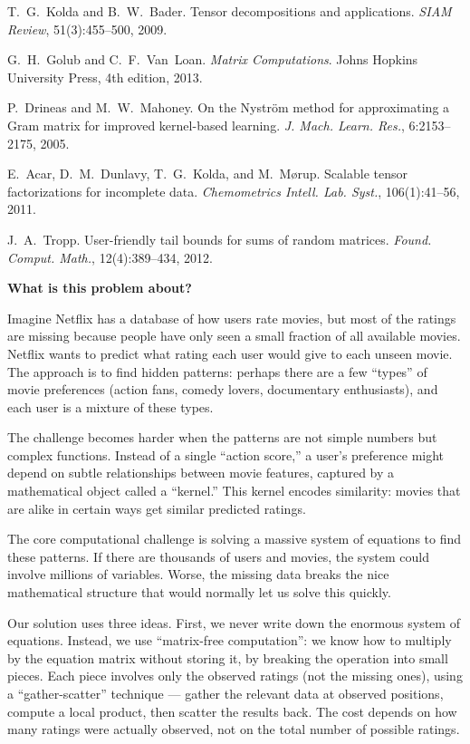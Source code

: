  T.~G.~Kolda and B.~W.~Bader.
Tensor decompositions and applications.
\emph{SIAM Review}, 51(3):455--500, 2009.

 G.~H.~Golub and C.~F.~Van~Loan.
\emph{Matrix Computations}.
Johns Hopkins University Press, 4th edition, 2013.

 P.~Drineas and M.~W.~Mahoney.
On the Nystr\"om method for approximating a Gram matrix for improved kernel-based learning.
\emph{J. Mach. Learn. Res.}, 6:2153--2175, 2005.

 E.~Acar, D.~M.~Dunlavy, T.~G.~Kolda, and M.~M{\o}rup.
Scalable tensor factorizations for incomplete data.
\emph{Chemometrics Intell. Lab. Syst.}, 106(1):41--56, 2011.

 J.~A.~Tropp.
User-friendly tail bounds for sums of random matrices.
\emph{Found. Comput. Math.}, 12(4):389--434, 2012.


\textbf{What is this problem about?}

Imagine Netflix has a database of how users rate movies, but most of the ratings
are missing because people have only seen a small fraction of all available movies.
Netflix wants to predict what rating each user would give to each unseen movie.
The approach is to find hidden patterns: perhaps there are a few ``types'' of
movie preferences (action fans, comedy lovers, documentary enthusiasts), and each
user is a mixture of these types.

The challenge becomes harder when the patterns are not simple numbers but complex
functions. Instead of a single ``action score,'' a user's preference might depend
on subtle relationships between movie features, captured by a mathematical object
called a ``kernel.'' This kernel encodes similarity: movies that are alike in
certain ways get similar predicted ratings.

The core computational challenge is solving a massive system of equations to find
these patterns. If there are thousands of users and movies, the system could involve
millions of variables. Worse, the missing data breaks the nice mathematical structure
that would normally let us solve this quickly.

Our solution uses three ideas. First, we never write down the enormous system of
equations. Instead, we use ``matrix-free computation'': we know how to multiply by
the equation matrix without storing it, by breaking the operation into small pieces.
Each piece involves only the observed ratings (not the missing ones), using a
``gather-scatter'' technique --- gather the relevant data at observed positions,
compute a local product, then scatter the results back. The cost depends on how
many ratings were actually observed, not on the total number of possible ratings.

